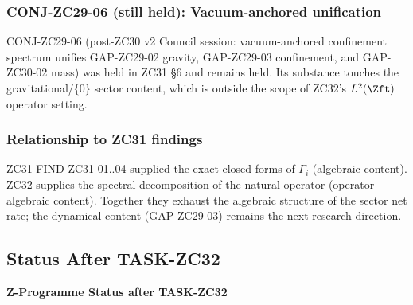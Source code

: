 \documentclass[12pt, a4paper]{article}
\begin{document}
\subsubsection{CONJ-ZC29-06 (still held): Vacuum-anchored
  unification}

CONJ-ZC29-06 (post-ZC30 v2 Council session: vacuum-anchored
confinement spectrum unifies GAP-ZC29-02 gravity,
GAP-ZC29-03 confinement, and GAP-ZC30-02 mass)
was held in ZC31 §6 and remains held. Its substance touches
the gravitational/$\{0\}$ sector content, which is outside
the scope of ZC32's $L^2(\Zft)$ operator setting.

\subsubsection{Relationship to ZC31 findings}

ZC31 FIND-ZC31-01..04 supplied the exact closed forms of
$\Gamma_i$ (algebraic content). ZC32 supplies the spectral
decomposition of the natural operator (operator-algebraic
content). Together they exhaust the algebraic structure of
the sector net rate; the dynamical content (GAP-ZC29-03)
remains the next research direction.

\subsection{Status After TASK-ZC32}
\label{sec:status}

{\small\color{crfgreen!20!black}\bfseries Z-Programme Status
after TASK-ZC32}
\vspace{2pt}
\end{document}
